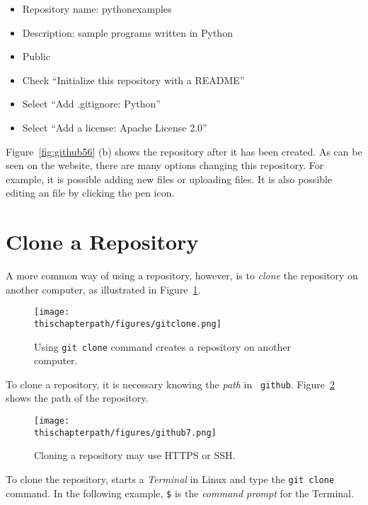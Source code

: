 \begin{itemize}
\item Repository name: pythonexamples
\item Description: sample programs written in Python
\item Public
\item Check ``Initialize this repository with a README''
\item Select ``Add .gitignore: Python''
\item Select ``Add a license: Apache License 2.0''
\end{itemize}


Figure~\ref{fig:github56} (b) shows the repository after it has been
created.  As can be seen on the website, there are many options
changing this repository.  For example, it is possible adding new
files or uploading files. It is also possible editing an file by
clicking the pen icon.

\section{Clone a Repository}

A more common way of using a repository, however, is to {\it clone} the
repository on another computer, as illustrated in Figure~\ref{fig:gitclone}.


\begin{figure}[h] \centering
{\texttt{[image: \\thischapterpath/figures/gitclone.png]}}
\caption{Using {\tt git clone} command creates a repository on another computer.}
\label{fig:gitclone}
\end{figure}

To clone a repository, it is necessary knowing the {\it path} in {\tt
  github}.  Figure~\ref{fig:github7} shows the path of the repository.

\begin{figure}[h] \centering
{\texttt{[image: \\thischapterpath/figures/github7.png]}}
\caption{Cloning a repository may use HTTPS or SSH.}
\label{fig:github7}
\end{figure}


\clearpage

To clone the repository, starts a {\it Terminal} in Linux
and type the {\tt git clone} command. In the following
example, {\tt \$} is the {\it command prompt} for the Terminal.

\vspace{0.2in}

